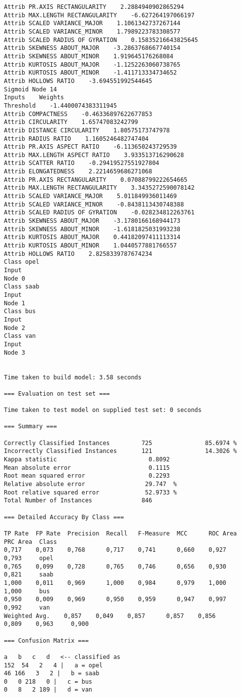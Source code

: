 \documentclass[
	article,			%
	11pt,				%
	oneside,			%
	a4paper,			%
	english,			%
	brazil,				%
	sumario=tradicional
	]{abntex2}
\begin{document}
\begin{lstlisting}
Attrib PR.AXIS RECTANGULARITY    2.2884940902865294
Attrib MAX.LENGTH RECTANGULARITY    -6.627264197066197
Attrib SCALED VARIANCE_MAJOR    1.1061342737267144
Attrib SCALED VARIANCE_MINOR    1.7989223783308577
Attrib SCALED RADIUS OF GYRATION    0.15835216643825645
Attrib SKEWNESS ABOUT_MAJOR    -3.2863768667740154
Attrib SKEWNESS ABOUT_MINOR    1.919645176268084
Attrib KURTOSIS ABOUT_MAJOR    -1.1252263060738765
Attrib KURTOSIS ABOUT_MINOR    -1.411713334734652
Attrib HOLLOWS RATIO    -3.694551992544645
Sigmoid Node 14
Inputs    Weights
Threshold    -1.4400074383311945
Attrib COMPACTNESS    -0.46336897622677853
Attrib CIRCULARITY    1.65747083242799
Attrib DISTANCE CIRCULARITY    1.80575173747978
Attrib RADIUS RATIO    1.1605246482747404
Attrib PR.AXIS ASPECT RATIO    -6.113650243729539
Attrib MAX.LENGTH ASPECT RATIO    3.933513716290628
Attrib SCATTER RATIO    -0.29419527551927804
Attrib ELONGATEDNESS    2.2214659686271068
Attrib PR.AXIS RECTANGULARITY    0.07088799222654665
Attrib MAX.LENGTH RECTANGULARITY    3.3435272590078142
Attrib SCALED VARIANCE_MAJOR    5.011849936011469
Attrib SCALED VARIANCE_MINOR    -0.8438113430748388
Attrib SCALED RADIUS OF GYRATION    -0.028234812263761
Attrib SKEWNESS ABOUT_MAJOR    -3.1780166168944173
Attrib SKEWNESS ABOUT_MINOR    -1.6181825031993238
Attrib KURTOSIS ABOUT_MAJOR    0.44182097411113314
Attrib KURTOSIS ABOUT_MINOR    1.0440577881766557
Attrib HOLLOWS RATIO    2.8258339787674234
Class opel
Input
Node 0
Class saab
Input
Node 1
Class bus
Input
Node 2
Class van
Input
Node 3


Time taken to build model: 3.58 seconds

=== Evaluation on test set ===

Time taken to test model on supplied test set: 0 seconds

=== Summary ===

Correctly Classified Instances         725               85.6974 %
Incorrectly Classified Instances       121               14.3026 %
Kappa statistic                          0.8092
Mean absolute error                      0.1115
Root mean squared error                  0.2293
Relative absolute error                 29.747  %
Root relative squared error             52.9733 %
Total Number of Instances              846     

=== Detailed Accuracy By Class ===

TP Rate  FP Rate  Precision  Recall   F-Measure  MCC      ROC Area  PRC Area  Class
0,717    0,073    0,768      0,717    0,741      0,660    0,927     0,793     opel
0,765    0,099    0,728      0,765    0,746      0,656    0,930     0,821     saab
1,000    0,011    0,969      1,000    0,984      0,979    1,000     1,000     bus
0,950    0,009    0,969      0,950    0,959      0,947    0,997     0,992     van
Weighted Avg.    0,857    0,049    0,857      0,857    0,856      0,809    0,963     0,900     

=== Confusion Matrix ===

a   b   c   d   <-- classified as
152  54   2   4 |   a = opel
46 166   3   2 |   b = saab
0   0 218   0 |   c = bus
0   8   2 189 |   d = van


\end{lstlisting}
\end{document}
